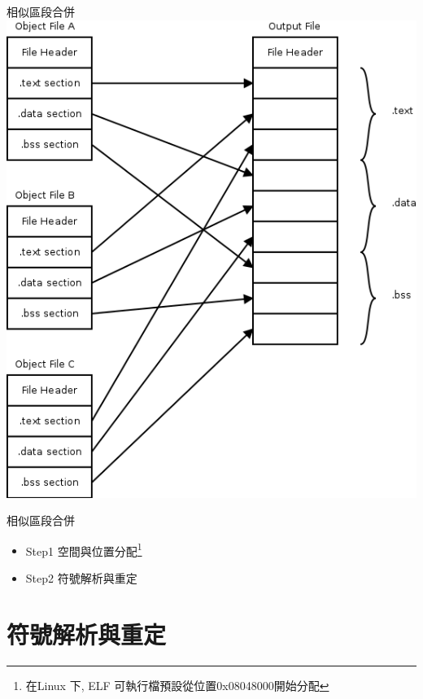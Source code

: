 \begin{frame}{相似區段合併}
\includegraphics[height=.8\textheight]{./img/4-2.png}
\end{frame}



\begin{frame}{相似區段合併}
    \begin{itemize}
        \item Step1 空間與位置分配\footnote[1]{在Linux 下, ELF 可執行檔預設從位置0x08048000開始分配}
        \item Step2 符號解析與重定
    \end{itemize}
\end{frame}


\section{符號解析與重定}

